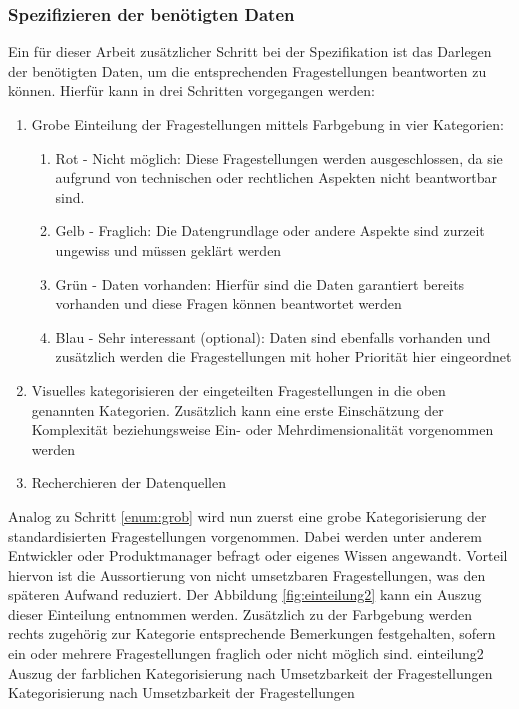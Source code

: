 \subsubsection{Spezifizieren der benötigten Daten}
\label{subsub:datenspez}
Ein für dieser Arbeit zusätzlicher Schritt bei der Spezifikation ist das Darlegen der benötigten Daten, um die entsprechenden Fragestellungen beantworten zu können.
Hierfür kann in drei Schritten vorgegangen werden:

\begin{enumerate}
\item \label{enum:grob} Grobe Einteilung der Fragestellungen mittels Farbgebung in vier Kategorien: %
	\begin{enumerate}
	\item Rot - Nicht möglich: Diese Fragestellungen werden ausgeschlossen, da sie aufgrund von technischen oder rechtlichen Aspekten nicht beantwortbar sind.
	\item Gelb - Fraglich: Die Datengrundlage oder andere Aspekte sind zurzeit ungewiss und müssen geklärt werden
	\item Grün - Daten vorhanden: Hierfür sind die Daten garantiert bereits vorhanden und diese Fragen können beantwortet werden
	\item Blau - Sehr interessant (optional): Daten sind ebenfalls vorhanden und zusätzlich werden die Fragestellungen mit hoher Priorität hier eingeordnet
	\end{enumerate}
\item Visuelles kategorisieren der eingeteilten Fragestellungen in die oben genannten Kategorien. 
Zusätzlich kann eine erste Einschätzung der Komplexität beziehungsweise Ein- oder Mehrdimensionalität vorgenommen werden
\item Recherchieren der Datenquellen
\end{enumerate}

Analog zu Schritt \ref{enum:grob} wird nun zuerst eine grobe Kategorisierung der standardisierten Fragestellungen vorgenommen. 
Dabei werden unter anderem Entwickler oder Produktmanager befragt oder eigenes Wissen angewandt.
Vorteil hiervon ist die Aussortierung von nicht umsetzbaren Fragestellungen, was den späteren Aufwand reduziert.
Der Abbildung \ref{fig:einteilung2} kann ein Auszug dieser Einteilung entnommen werden.
Zusätzlich zu der Farbgebung werden rechts zugehörig zur Kategorie entsprechende Bemerkungen festgehalten, sofern ein oder mehrere Fragestellungen fraglich oder nicht möglich sind.
\bildbreit
{einteilung2}
{Auszug der farblichen Kategorisierung nach Umsetzbarkeit der Fragestellungen}
{Kategorisierung nach Umsetzbarkeit der Fragestellungen}

